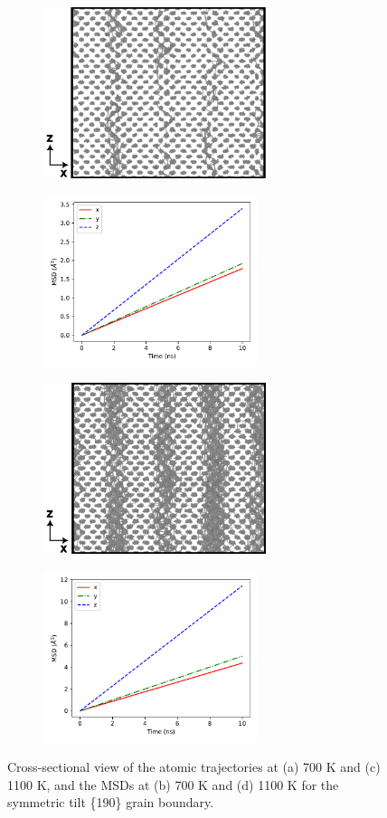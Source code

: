\documentclass{elsarticle}
\begin{document}
\begin{figure}[!ht]
\centering
	\begin{subfigure}{0.49\textwidth}
		\centering
		\caption{}
		\includegraphics[height=5cm]{190at700cs.png}
	\end{subfigure}
	\begin{subfigure}{0.49\textwidth}
		\centering
		\caption{}
		\includegraphics[height=5cm]{190at700xyz.pdf}
	\end{subfigure}
    \par\medskip
	\begin{subfigure}{0.49\textwidth}
		\centering
		\caption{}
		\includegraphics[height=5cm]{190at1100cs.png}
	\end{subfigure}
	\begin{subfigure}{0.49\textwidth}
		\centering
		\caption{}
		\includegraphics[height=5cm]{190at1100xyz.pdf}
	\end{subfigure}
\caption{Cross-sectional view of the atomic trajectories at (a) 700 K and (c) 1100 K, and the MSDs at (b) 700 K and (d) 1100 K for the symmetric tilt \{190\} grain boundary.}
\label{fig:190}
\end{figure}
\end{document}
